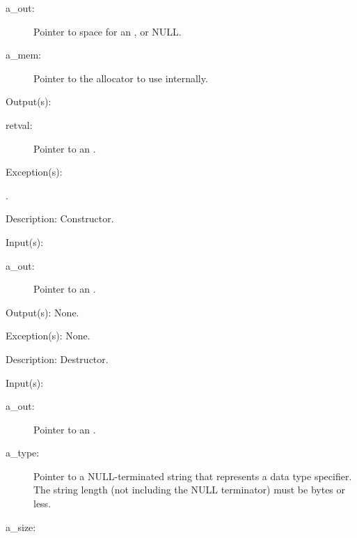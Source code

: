 \begin{capi}
\begin{capilist}
\begin{description}
		\item[a\_out: ]
			Pointer to space for an , or NULL.
		\item[a\_mem: ]
			Pointer to the allocator to use internally.
		\end{description}
	\item[Output(s): ]
		\begin{description}\item[]
		\item[retval: ]
			Pointer to an .
		\end{description}
	\item[Exception(s): ]
		\begin{description}\item[]
		\item[.]
		\end{description}
	\item[Description: ]
		Constructor.
	\end{capilist}
\label{out_delete}
	\begin{capilist}
	\item[Input(s): ]
		\begin{description}\item[]
		\item[a\_out: ]
			Pointer to an .
		\end{description}
	\item[Output(s): ] None.
	\item[Exception(s): ] None.
	\item[Description: ]
		Destructor.
	\end{capilist}
\label{out_register}
	\begin{capilist}
	\item[Input(s): ]
		\begin{description}\item[]
		\item[a\_out: ]
			Pointer to an \classname{out}.
		\item[a\_type: ]
			Pointer to a NULL-terminated string that represents a
			data type specifier.  The string length (not including
			the NULL terminator) must be
			 bytes or less.
		\item[a\_size: ]

\end{description}
\end{capilist}
\end{capi}
